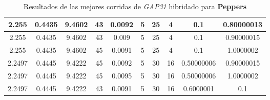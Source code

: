\begin{table}[h!]
\begin{center}
\begin{tabular}{|c|c|c|c|c|c|c|c|c|c|}
        \hline
            2.255 & 0.4435  & 9.4602 & 43 & 0.0092 & 5 & 25 & 4 & 0.1 & 0.80000013\\
        \hline
        \hline
            2.255 & 0.4435  & 9.4602 & 43 & 0.009 & 5 & 25 & 4 & 0.1 & 0.90000015\\
        \hline
        \hline
            2.255 & 0.4435  & 9.4602 & 45 & 0.0091 & 5 & 25 & 4 & 0.1 & 1.0000002\\
        \hline
        \hline
            2.2497 & 0.4445  & 9.4222 & 45 & 0.0092 & 5 & 30 & 16 & 0.50000006 & 0.90000015\\
        \hline
        \hline
            2.2497 & 0.4445  & 9.4222 & 45 & 0.0095 & 5 & 30 & 16 & 0.50000006 & 1.0000002\\
        \hline
        \hline
            2.2497 & 0.4445  & 9.4222 & 43 & 0.0091 & 5 & 30 & 16 & 0.6000001 & 0.1\\
        \hline
        \end{tabular}
        \caption{Resultados de las mejores corridas de \emph{GAP31} hibridado para {\bf Peppers}}
        \label{tb:tableGAP31}
    \end{center}
\end{table}
